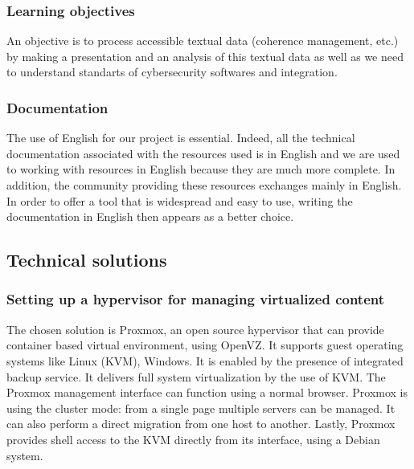 \vspace{0.5cm}
\subsubsection{Learning objectives}
An objective is to process accessible textual data (coherence management, etc.) by making a presentation and an analysis of this textual data as well as we need to understand standarts of cybersecurity softwares and integration. \\



\vspace{0.5cm}
\subsubsection{Documentation}
The use of English for our project is essential. Indeed, all the technical
documentation associated with the resources used is in English and we are used
to working with resources in English because they are much more complete. In
addition, the community providing these resources exchanges mainly in English. In order
to offer a tool that is widespread and easy to use, writing the
documentation in English then appears as a better choice. \\


\pagebreak

\subsection{Technical solutions}

\vspace{1cm}
\subsubsection{Setting up a hypervisor for managing virtualized content}

The chosen solution is Proxmox, an open source hypervisor that can provide container based virtual environment, using OpenVZ.
It supports guest operating systems like Linux (KVM), Windows. It is enabled by the presence of integrated backup service.
It delivers full system virtualization by the use of KVM.
The Proxmox management interface can function using a normal browser.
Proxmox is using the cluster mode: from a single page multiple servers can be managed.
It can also perform a direct migration from one host to another.
Lastly, Proxmox provides shell access to the KVM directly from its interface, using a Debian system.

